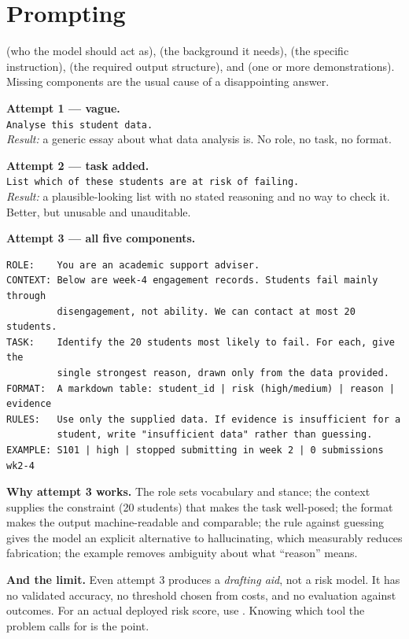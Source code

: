 \section{Prompting}

\begin{definitionbox}
 (who the model should act as),  (the background it
needs),  (the specific instruction),  (the required output
structure), and  (one or more demonstrations). Missing components are
the usual cause of a disappointing answer.
\end{definitionbox}

\begin{worked}
\textbf{Attempt 1 --- vague.}\\
\texttt{Analyse this student data.}\\
\emph{Result:} a generic essay about what data analysis is. No role, no task, no
format.

\smallskip
\textbf{Attempt 2 --- task added.}\\
\texttt{List which of these students are at risk of failing.}\\
\emph{Result:} a plausible-looking list with no stated reasoning and no way to
check it. Better, but unusable and unauditable.

\smallskip
\textbf{Attempt 3 --- all five components.}
\begin{lstlisting}[basicstyle=\ttfamily\tiny, frame=none, backgroundcolor=\color{codebg}]
ROLE:    You are an academic support adviser.
CONTEXT: Below are week-4 engagement records. Students fail mainly through
         disengagement, not ability. We can contact at most 20 students.
TASK:    Identify the 20 students most likely to fail. For each, give the
         single strongest reason, drawn only from the data provided.
FORMAT:  A markdown table: student_id | risk (high/medium) | reason | evidence
RULES:   Use only the supplied data. If evidence is insufficient for a
         student, write "insufficient data" rather than guessing.
EXAMPLE: S101 | high | stopped submitting in week 2 | 0 submissions wk2-4
\end{lstlisting}

\smallskip
\textbf{Why attempt 3 works.} The role sets vocabulary and stance; the context
supplies the constraint (20 students) that makes the task well-posed; the format
makes the output machine-readable and comparable; the rule against guessing gives
the model an explicit alternative to hallucinating, which measurably reduces
fabrication; the example removes ambiguity about what ``reason'' means.

\smallskip
\textbf{And the limit.} Even attempt 3 produces a \emph{drafting aid}, not a risk
model. It has no validated accuracy, no threshold chosen from costs, and no
evaluation against outcomes. For an actual deployed risk score, use
. Knowing which tool the problem calls for is the point.
\end{worked}


